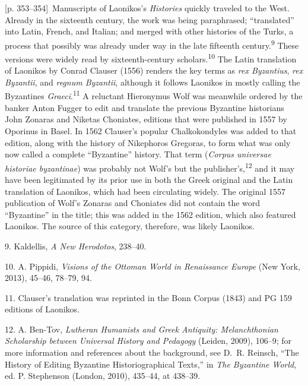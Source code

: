 \documentclass[10pt,a4paper]{article}
\begin{document}
{\scriptsize\color{gray}[p. 353–354]}\ Manuscripts of Laonikos’s \textit{Histories} quickly traveled to the West. Already in the sixteenth century, the work was being paraphrased; “translated” into Latin, French, and Italian; and merged with other histories of the Turks, a process that possibly was already under way in the late fifteenth century.\nobreak\textsuperscript{9} These versions were widely read by sixteenth-century scholars.\nobreak\textsuperscript{10} The Latin translation of Laonikos by Conrad Clauser (1556) renders the key terms as \textit{rex Byzantius}, \textit{rex Byzantii}, and \textit{regnum Byzantii}, although it follows Laonikos in mostly calling the Byzantines \textit{Graeci}.\nobreak\textsuperscript{11} A reluctant Hieronymus Wolf was meanwhile ordered by the banker Anton Fugger to edit and translate the previous Byzantine historians John Zonaras and Niketas Choniates, editions that were published in 1557 by Oporinus in Basel. In 1562 Clauser’s popular Chalkokondyles was added to that edition, along with the history of Nikephoros Gregoras, to form what was only now called a complete “Byzantine” history. That term (\textit{Corpus universae historiae byzantinae}) was probably not Wolf’s but the publisher’s,\nobreak\textsuperscript{12} and it may have been legitimated by its prior use in both the Greek original and the Latin translation of Laonikos, which had been circulating widely. The original 1557 publication of Wolf’s Zonaras and Choniates did not contain the word “Byzantine” in the title; this was added in the 1562 edition, which also featured Laonikos. The source of this category, therefore, was likely Laonikos.\par{\small 9.  Kaldellis, \textit{A New Herodotos}, 238–40.\par}{\small 10. A. Pippidi, \textit{Visions of the Ottoman World in Renaissance Europe} (New York, 2013), 45–46, 78–79, 94.\par}{\small 11.  Clauser’s translation was reprinted in the Bonn Corpus (1843) and PG 159\textit{ }editions of Laonikos.\par}{\small 12.  A. Ben-Tov, \textit{Lutheran Humanists and Greek Antiquity: Melanchthonian Scholarship between Universal History and Pedagogy} (Leiden, 2009), 106–9; for more information and references about the background, see D. R. Reinsch, “The History of Editing Byzantine Historiographical Texts,” in \textit{The Byzantine World}, ed. P. Stephenson (London, 2010), 435–44, at 438–39.\par}
\end{document}
